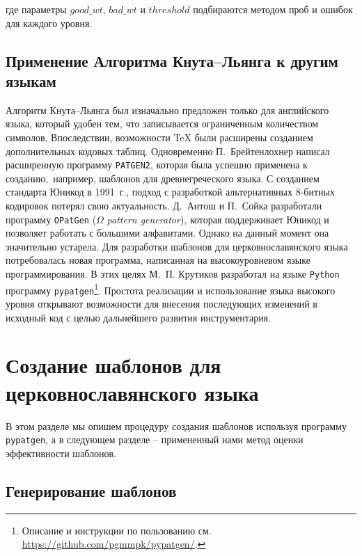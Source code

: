 \documentclass[12pt,a4paper,oneside]{extarticle}
\begin{document}
\noindent где параметры $good\_wt$, $bad\_wt$ и $threshold$ подбираются методом проб и ошибок для каждого уровня.

\subsection{Применение Алгоритма Кнута--Льянга к другим языкам}

Алгоритм Кнута--Льянга был изначально предложен только для английского языка, который удобен тем, что записывается ограниченным количеством символов. Впоследствии, возможности \TeX{} были расширены созданием дополнительных кодовых таблиц\autocite[Кодировка \textenglish{Extended \TeX{} Font Encoding Scheme} (ET). См. ][]{ferguson1990}. Одновременно П.~Брейтенлохнер написал расширенную программу \verb+PATGEN2+\autocite[См. описание в пособии ][]{patgen2}, которая была успешно применена к созданию, например, шаблонов для древнегреческого языка\autocite[][]{haralambous1992}. С созданием стандарта Юникод в 1991~г., подход с разработкой альтернативных 8-битных кодировок потерял свою актуальность. Д.~Антош и  П.~Сойка разработали программу \texttt{OPatGen} ($\Omega$ \emph{pattern generator}), которая поддерживает Юникод и позволяет работать с большими алфавитами\autocite[][]{sojka2003}. Однако на данный момент она значительно устарела. Для разработки шаблонов для церковнославянского языка потребовалась новая программа, написанная на  высокоуровневом языке программирования. В этих целях М.~П. Крутиков разработал на языке \verb+Python+ программу \verb+pypatgen+\footnote{Описание и инструкции по пользованию см. \url{https://github.com/pgmmpk/pypatgen/}.}. Простота реализации и использование языка высокого уровня открывают возможности для внесения последующих изменений в исходный код с целью дальнейшего развития инструментария.

\section{Создание шаблонов для церковнославянского языка}

В этом разделе мы опишем процедуру создания шаблонов используя программу \verb+pypatgen+, а в следующем разделе -- примененный нами метод оценки эффективности шаблонов.

\subsection{Генерирование шаблонов}
\end{document}
